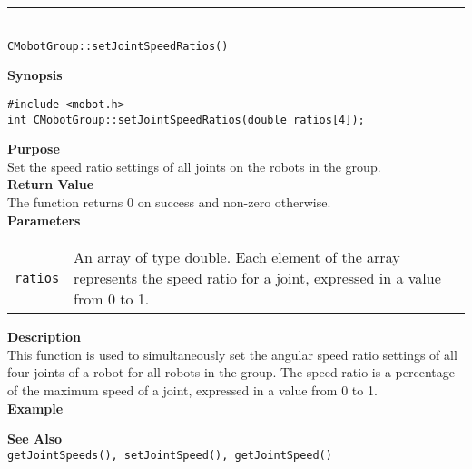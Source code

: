 \noindent
\vspace{5pt}
\rule{4.5in}{0.015in}\\
\noindent
{\LARGE \texttt{CMobotGroup::setJointSpeedRatios()}}\\
{}

\noindent
{\bf Synopsis}
\begin{verbatim}
#include <mobot.h>
int CMobotGroup::setJointSpeedRatios(double ratios[4]);
\end{verbatim}

\noindent
{\bf Purpose}\\
Set the speed ratio settings of all joints on the robots in the group.\\

\noindent
{\bf Return Value}\\
The function returns 0 on success and non-zero otherwise.\\

\noindent
{\bf Parameters}
\vspace{-0.1in}
\begin{description}
\item               
\begin{tabular}{p{10 mm}p{145 mm}}
\texttt{ratios} & An array of type double. Each element of the array
represents the speed ratio for a joint, expressed in a value from 0 to 1. \\
\end{tabular}
\end{description}

\noindent
{\bf Description}\\
This function is used to simultaneously set the angular speed ratio settings of
all four joints of a robot for all robots in the group. The speed ratio is a percentage of the maximum
speed of a joint, expressed in a value from 0 to 1.\\

\noindent
{\bf Example}\\
\noindent

\noindent
{\bf See Also}\\
\texttt{getJointSpeeds(), setJointSpeed(), getJointSpeed()}

